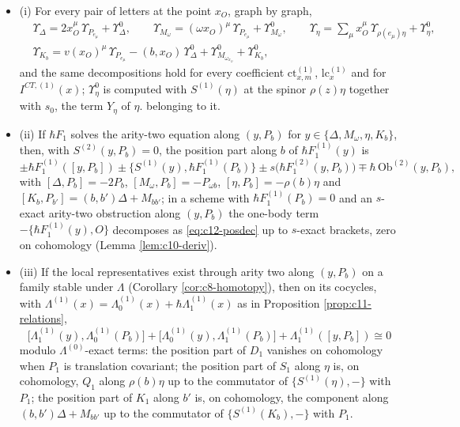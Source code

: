 \begin{theorem}
\label{thm:c12-pos}
\begin{itemize}
\item (i) For every pair of letters at the point $x_O$, graph by graph,
\begin{equation}
\begin{aligned}
&\Upsilon_\Delta=2x_O^\mu\,\Upsilon_{P_{e_\mu}}+\Upsilon^0_\Delta,\qquad \Upsilon_{M_\omega}=(\omega x_O)^\mu\,\Upsilon_{P_{e_\mu}}+\Upsilon^0_{M_\omega},\qquad \Upsilon_\eta=\sum_\mu x_O^\mu\,\Upsilon_{\rho(e_\mu)\eta}+\Upsilon^0_\eta,\\
&\Upsilon_{K_b}=v(x_O)^\mu\,\Upsilon_{P_{e_\mu}}-(b,x_O)\,\Upsilon^0_\Delta+\Upsilon^0_{M_{\omega_{x_O}}}+\Upsilon^0_{K_b},
\end{aligned}
\label{eq:c12-posdec}
\end{equation}
and the same decompositions hold for every coefficient $\mathrm{ct}^{(1)}_{x,m}$, $\mathrm{lc}^{(1)}_x$ and for $I^{CT,(1)}(x)$; $\Upsilon^0_\eta$ is computed with $S^{(1)}(\eta)$ at the spinor $\rho(z)\eta$ together with $s_0$, the term $Y_\eta$ of $\eta.$ belonging to it.
\item (ii) If $\hbar F_1$ solves the arity-two equation along $(y,P_b)$ for $y\in\{\Delta,M_\omega,\eta,K_b\}$, then, with $S^{(2)}(y,P_b)=0$, the position part along $b$ of $\hbar F_1^{(1)}(y)$ is
\begin{equation}
\pm\hbar F_1^{(1)}([y,P_b])\pm\big\{S^{(1)}(y),\hbar F_1^{(1)}(P_b)\big\}\pm s\big(\hbar F_1^{(2)}(y,P_b)\big)\mp\hbar\,\mathrm{Ob}^{(2)}(y,P_b),
\label{eq:c12-onebodypos}
\end{equation}
with $[\Delta,P_b]=-2P_b$, $[M_\omega,P_b]=-P_{\omega b}$, $[\eta,P_b]=-\rho(b)\eta$ and $[K_b,P_{b'}]=(b,b')\Delta+M_{bb'}$; in a scheme with $\hbar F_1^{(1)}(P_b)=0$ and an $s$-exact arity-two obstruction along $(y,P_b)$ the one-body term $-\{\hbar F_1^{(1)}(y),O\}$ decomposes as \eqref{eq:c12-posdec} up to $s$-exact brackets, zero on cohomology (Lemma \ref{lem:c10-deriv}).
\item (iii) If the local representatives exist through arity two along $(y,P_b)$ on a family stable under $\Lambda$ (Corollary \ref{cor:c8-homotopy}), then on its cocycles, with $\Lambda^{(1)}(x)=\Lambda^{(1)}_0(x)+\hbar\Lambda^{(1)}_1(x)$ as in Proposition \ref{prop:c11-relations},
\begin{equation}
\big[\Lambda^{(1)}_1(y),\Lambda^{(1)}_0(P_b)\big]+\big[\Lambda^{(1)}_0(y),\Lambda^{(1)}_1(P_b)\big]+\Lambda^{(1)}_1([y,P_b])\cong0
\label{eq:c12-poscoh}
\end{equation}
modulo $\Lambda^{(0)}$-exact terms: the position part of $D_1$ vanishes on cohomology when $P_1$ is translation covariant; the position part of $S_1$ along $\eta$ is, on cohomology, $Q_1$ along $\rho(b)\eta$ up to the commutator of $\{S^{(1)}(\eta),-\}$ with $P_1$; the position part of $K_1$ along $b'$ is, on cohomology, the component along $(b,b')\Delta+M_{bb'}$ up to the commutator of $\{S^{(1)}(K_b),-\}$ with $P_1$.
\end{itemize}
\end{theorem}

